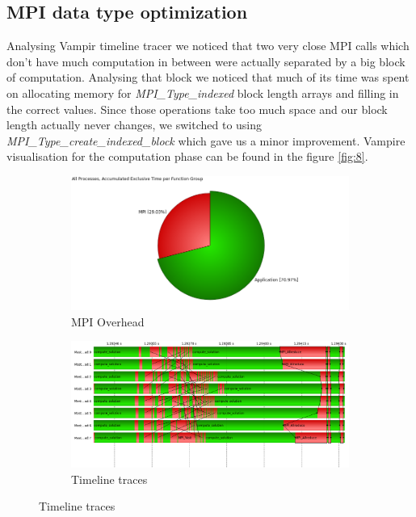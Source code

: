 \documentclass{article}
\begin{document}
\subsection{MPI data type optimization}
Analysing Vampir timeline tracer we noticed that two very close MPI calls which don't have much computation in between were actually separated by a big block of computation. Analysing that block we noticed that much of its time was spent on allocating memory for \textit{MPI\_Type\_indexed} block length arrays and filling in the correct values. Since those operations take too much space and our block length actually never changes, we switched to using \textit{MPI\_Type\_create\_indexed\_block} which gave us a minor improvement. Vampire visualisation for the computation phase can be found in the figure \ref{fig:8}.
\begin{figure}
	\centering
	\begin{subfigure}[b]{\textwidth}
		\includegraphics[width=\textwidth]{iter-pent-dual-allread-8-Function_Summary_traces.png}
		\caption{MPI Overhead}
		\label{fig:overhead}
	\end{subfigure}
	\begin{subfigure}[b]{\textwidth}
		\includegraphics[width=\textwidth]{iter-pent-dual-allread-8-Master_Timeline_traces.png}
		\caption{Timeline traces}
		\label{fig:traces}
	\end{subfigure}

\end{figure}
\end{document}
